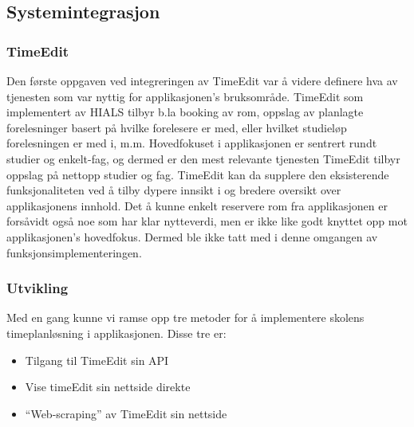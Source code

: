 \documentclass[../main.tex]{subfiles}
\begin{document}
\subsection{Systemintegrasjon}

\subsubsection{TimeEdit}

Den første oppgaven ved integreringen av TimeEdit var å videre definere hva av tjenesten som var nyttig for applikasjonen’s bruksområde. TimeEdit som implementert av HIALS tilbyr b.la booking av rom, oppslag av planlagte forelesninger basert på hvilke forelesere er med, eller hvilket studieløp forelesningen er med i, m.m.   \newline
\newline
Hovedfokuset i applikasjonen er sentrert rundt studier og enkelt-fag, og dermed er den mest relevante tjenesten TimeEdit tilbyr oppslag på nettopp studier og fag. TimeEdit kan da supplere den eksisterende funksjonaliteten ved å tilby dypere innsikt i og bredere oversikt over applikasjonens innhold.\newline
\newline
Det å kunne enkelt reservere rom fra applikasjonen er forsåvidt også noe som har klar nytteverdi, men er ikke like godt knyttet opp mot applikasjonen’s hovedfokus. Dermed ble ikke tatt med i denne omgangen av funksjonsimplementeringen.

\subsubsection{Utvikling}

Med en gang kunne vi ramse opp tre metoder for å implementere skolens timeplanløsning i applikasjonen. Disse tre er:

\begin{itemize}
\item Tilgang til TimeEdit sin API
\item Vise timeEdit sin nettside direkte
\item “Web-scraping” av TimeEdit sin nettside
\end{itemize}
\end{document}
